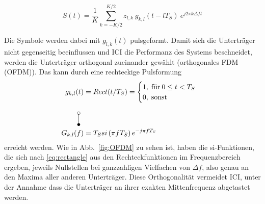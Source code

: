 \begin{equation}
    S(t) = \frac{1}{K} \sum \limits_{k=-K/2}^{K/2} z_{l,k} \: g_{k,l}(t-lT_S) \: e^{j2\pi k \Delta f t}
\label{eq:ofdm_dft}
\end{equation}

Die Symbole werden dabei mit $g_{l,k}(t)$ pulsgeformt. Damit sich die Unterträger nicht gegenseitig beeinflussen und \ac{ICI} die Performanz des Systems beschneidet, werden die Unterträger orthogonal zueinander gewählt (orthogonales \ac{FDM} (OFDM)). Das kann durch eine rechteckige Pulsformung 
\begin{equation}
\label{eq:rectangle}
\begin{aligned}
g_{k,l}(t) &= Rect(t/T_S) = 
    \begin{cases}
    1, \; \text{für} \: 0 \leq t < T_S \\
    0, \; \text{sonst}
    \end{cases}\\
\rotatebox{270}{\laplace} \\
G_{k,l}(f) &= T_S si\left(\pi f T_S\right) e^{-j \pi f T_S}
\end{aligned}
\end{equation}
erreicht werden. Wie in Abb.~\ref{fig:OFDM} zu sehen ist, haben die si-Funktionen, die sich nach \ref{eq:rectangle} aus den Rechteckfunktionen im Frequenzbereich ergeben, jeweils Nullstellen bei ganzzahligen Vielfachen von $\Delta f$, also genau an den Maxima aller anderen Unterträger. Diese Orthogonalität vermeidet \ac{ICI}, unter der Annahme dass die Unterträger an ihrer exakten Mittenfrequenz abgetastet werden.

\begin{center}
\end{center}

